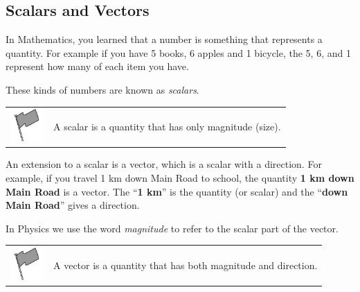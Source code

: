             \subsection{ Scalars and Vectors}
            \nopagebreak
      \label{m38812*id186720}In Mathematics, you learned that a number is something that represents a quantity. For example if you have 5 books, 6 apples and 1 bicycle, the 5, 6, and 1 represent how many of each item you have.\par 
      \label{m38812*id186725}These kinds of numbers are known as \textsl{scalars}.\par 
\label{m38812*fhsst!!!underscore!!!id78}\begin{definition}
	  \begin{tabular*}{15 cm}{m{15 mm}m{}}
	\hspace*{-50pt}  \includegraphics[width=0.5in]{col11305.imgs/psflag2.png}   & \Definition{   \label{id2510220}\textbf{ Scalar }} { \label{m38812*meaningfhsst!!!underscore!!!id78}
      \label{m38812*id186740}A scalar is a quantity that has only magnitude (size). \par 
       } 
      \end{tabular*}
      \end{definition}
      \label{m38812*id186750}An extension to a scalar is a vector, which is a scalar with a direction. For example, if you travel 1 km down Main Road to school, the quantity \textbf{1 km down Main Road} is a vector. The ``\textbf{1 km}'' is the quantity (or scalar) and the ``\textbf{down Main Road}'' gives a direction.\par 
      \label{m38812*id186771}In Physics we use the word \textsl{magnitude} to refer to the scalar part of the vector.\par 
\label{m38812*fhsst!!!underscore!!!id83}\begin{definition}
	  \begin{tabular*}{15 cm}{m{15 mm}m{}}
	\hspace*{-50pt}  \includegraphics[width=0.5in]{col11305.imgs/psflag2.png}   & \Definition{   \label{id2510284}\textbf{ Vectors }} { \label{m38812*meaningfhsst!!!underscore!!!id83}
      \label{m38812*id186786}A vector is a quantity that has both magnitude and direction. \par 
       } 
      \end{tabular*}
      \end{definition}
